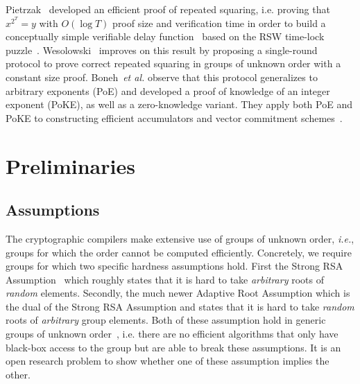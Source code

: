 \documentclass{article}
\theoremstyle{definition}
\begin{document}
Pietrzak~\cite{ITCS:Pietrzak18} developed an efficient proof of repeated squaring, i.e. proving that $x^{2^T} = y$ with $O(\log T)$ proof size and verification time in order to build a conceptually simple verifiable delay function~\cite{C:BBBF18} based on the RSW time-lock puzzle~\cite{RivShaWag96}. Wesolowski~\cite{EC:Wesolowski19} improves on this result by proposing a single-round protocol to prove correct repeated squaring in groups of unknown order with a constant size proof. Boneh~\emph{et al.} observe that this protocol generalizes to arbitrary exponents (PoE) and developed a proof of knowledge of an integer exponent (PoKE), as well as a zero-knowledge variant. They apply both PoE and PoKE to constructing efficient accumulators and vector commitment schemes~\cite{C:BonBunFis19}.

\section{Preliminaries}

\subsection{Assumptions}

The cryptographic compilers make extensive use of groups of unknown order, \emph{i.e.}, groups for which the order cannot be computed efficiently.
Concretely, we require groups for which two specific hardness assumptions hold.
First the Strong RSA Assumption~\cite{CCS:CraSho99} which roughly states that it is hard to take \emph{arbitrary} roots of \emph{random} elements. Secondly, the much newer Adaptive Root Assumption\cite{EC:Wesolowski19} which is the dual of the Strong RSA Assumption and states that it is hard to take \emph{random} roots of \emph{arbitrary} group elements. 
Both of these assumption hold in generic groups of unknown order~\cite{genericunknown,C:BonBunFis19}, i.e. there are no efficient algorithms that only have black-box access to the group but are able to break these assumptions. 
It is an open research problem to show whether one of these assumption implies the other.
\end{document}
